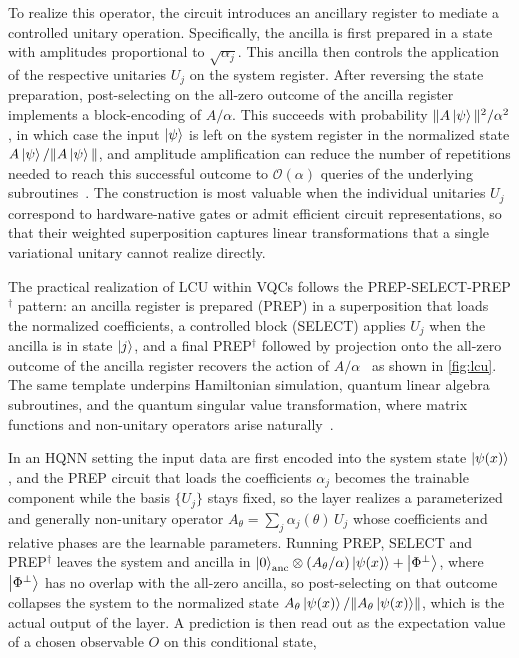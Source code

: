 \documentclass[aps,10pt,groupedaddress,prx,superscriptaddress,twocolumn,balancelastpage, tightenlines]{revtex4-2}
\theoremstyle{plain}  %
\begin{document}
To realize this operator, the circuit introduces an ancillary register to mediate a controlled unitary operation. Specifically, the ancilla is first prepared in a state with amplitudes proportional to $\sqrt{\alpha_j}$. This ancilla then controls the application of the respective unitaries $U_j$ on the system register. After reversing the state preparation, post-selecting on the all-zero outcome of the ancilla register implements a block-encoding of $A/\alpha$. This succeeds with probability $\|A\ket{\psi}\|^2 / \alpha^2$, in which case the input $\ket{\psi}$ is left on the system register in the normalized state $A\ket{\psi}/\|A\ket{\psi}\|$, and amplitude amplification can reduce the number of repetitions needed to reach this successful outcome to $\mathcal{O}(\alpha)$ queries of the underlying subroutines~\cite{gilyen2019quantum, low2019hamiltonian}. The construction is most valuable when the individual unitaries $U_j$ correspond to hardware-native gates or admit efficient circuit representations, so that their weighted superposition captures linear transformations that a single variational unitary cannot realize directly.

The practical realization of LCU within \gls{VQC}s follows the PREP-SELECT-PREP$^\dagger$ pattern: an ancilla register is prepared (PREP) in a superposition that loads the normalized coefficients, a controlled block (SELECT) applies $U_j$ when the ancilla is in state $\ket{j}$, and a final PREP$^\dagger$ followed by projection onto the all-zero outcome of the ancilla register recovers the action of $A/\alpha$~\cite{childs2012hamiltonian} as shown in \autoref{fig:lcu}. The same template underpins Hamiltonian simulation, quantum linear algebra subroutines, and the quantum singular value transformation, where matrix functions and non-unitary operators arise naturally~\cite{harrow_quantum_2009, berry2015simulating, gilyen2019quantum}.

In an HQNN setting the input data are first encoded into the system state $\ket{\psi(x)}$, and the PREP circuit that loads the coefficients $\alpha_j$ becomes the trainable component while the basis $\{U_j\}$ stays fixed, so the layer realizes a parameterized and generally non-unitary operator $A_{\theta} = \sum_j \alpha_j(\theta)\,U_j$ whose coefficients and relative phases are the learnable parameters. Running PREP, SELECT and PREP$^\dagger$ leaves the system and ancilla in $\ket{0}_{\mathrm{anc}} \otimes (A_{\theta}/\alpha)\ket{\psi(x)} + \ket{\Phi^{\perp}}$, where $\ket{\Phi^{\perp}}$ has no overlap with the all-zero ancilla, so post-selecting on that outcome collapses the system to the normalized state $A_{\theta}\ket{\psi(x)}/\lVert A_{\theta}\ket{\psi(x)}\rVert$, which is the actual output of the layer. A prediction is then read out as the expectation value of a chosen observable $O$ on this conditional state, 
\end{document}
